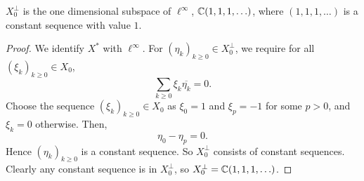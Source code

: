\documentclass{unswmaths}
\begin{document}
\begin{theorem}
    $X_0^\perp$ is the one dimensional subspace of $\ell^\infty$, $\mathbb{C}(1,1,1,\ldots)$, where $(1,1,1,\ldots)$
    is a constant sequence with value $1$.
\end{theorem}
\begin{proof}
    We identify $X^*$ with $\ell^\infty$. For $(\eta_k)_{k\geq 0} \in X_0^\perp$, we require for all $(\xi_k)_{k\geq 0} \in X_0$,
    \begin{equation*}
        \sum_{k\geq 0} \xi_k \overline{\eta_k} = 0.
    \end{equation*}
    Choose the sequence $(\xi_k)_{k\geq 0} \in X_0$ as $\xi_0 = 1$ and $\xi_p = -1$ for some $p > 0$,
    and $\xi_k = 0$ otherwise. Then,
    \begin{equation*}
        \eta_0 - \eta_p = 0.
    \end{equation*}
    Hence $(\eta_k)_{k\geq 0}$ is a constant sequence. So $X_0^\perp$ consists of constant sequences. Clearly
    any constant sequence is in $X_0^\perp$, so $X_0^\perp = \mathbb{C}(1,1,1,\ldots)$.
\end{proof}
\end{document}
